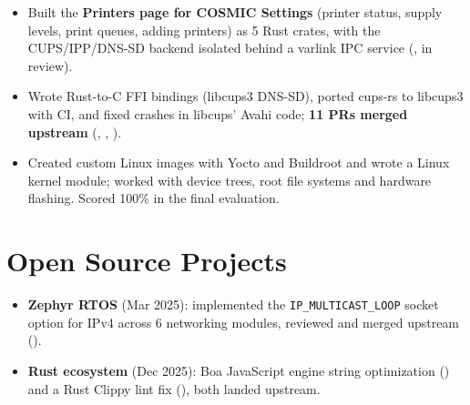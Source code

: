 \documentclass[10pt]{article}
\begin{document}
\begin{itemize}
  \item Built the \textbf{Printers page for COSMIC Settings} (printer status, supply levels, print queues, adding printers) as 5 Rust crates, with the CUPS/IPP/DNS-SD backend isolated behind a varlink IPC service (, in review).
  \item Wrote Rust-to-C FFI bindings (libcups3 DNS-SD), ported cups-rs to libcups3 with CI, and fixed crashes in libcups' Avahi code; \textbf{11 PRs merged upstream} (, , ).
\end{itemize}
\begin{itemize}
  \item Created custom Linux images with Yocto and Buildroot and wrote a Linux kernel module; worked with device trees, root file systems and hardware flashing. Scored 100\% in the final evaluation.
\end{itemize}

\section*{Open Source Projects}
\begin{itemize}
  \item \textbf{Zephyr RTOS} (Mar 2025): implemented the \texttt{IP\_MULTICAST\_LOOP} socket option for IPv4 across 6 networking modules, reviewed and merged upstream ().
  \item \textbf{Rust ecosystem} (Dec 2025): Boa JavaScript engine string optimization () and a Rust Clippy lint fix (), both landed upstream.
\end{itemize}
\end{document}
